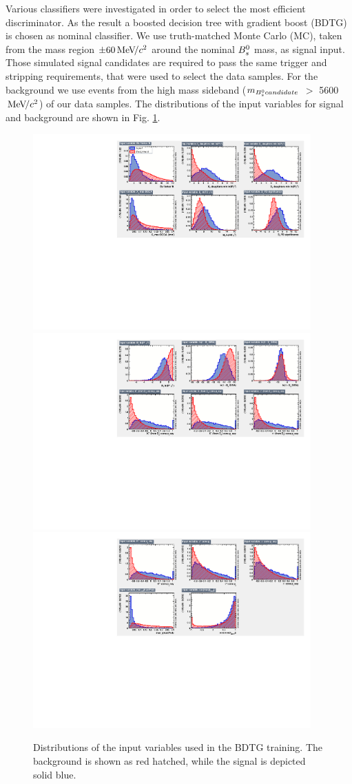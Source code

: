 Various classifiers were investigated in order to select the most efficient discriminator. As the result a boosted decision tree with gradient boost (BDTG) is chosen as nominal classifier. 
We use truth-matched Monte Carlo (MC), taken from the mass region $\pm 60 {\mathrm{\,Me\kern -0.1em V\!/}c^2}$ around the nominal ${{B}^0_{s}}$ mass, as signal input. 
Those simulated signal candidates are required to pass the same trigger and stripping requirements, that were used to select the data samples. 
For the background we use events from the high mass sideband ($m_{{{B}^0_{s}} candidate}$ $>$ 5600 ${\mathrm{\,Me\kern -0.1em V\!/}c^2}$) of our data samples. \newline
The distributions of the input variables for signal and background are shown in Fig. \ref{fig:BDT_Input_1}. 

\begin{figure}[h]
\includegraphics[height=6.cm,width=0.95\textwidth]{figs/BDT_Input_1.pdf}
\includegraphics[height=6.cm,width=0.95\textwidth]{figs/BDT_Input_2.pdf}
\includegraphics[height=6.cm,width=0.95\textwidth]{figs/BDT_Input_3.pdf}
\caption{Distributions of the input variables used in the BDTG training. The background is shown as red hatched, while the signal is depicted solid blue.}
\label{fig:BDT_Input_1}
\end{figure}


